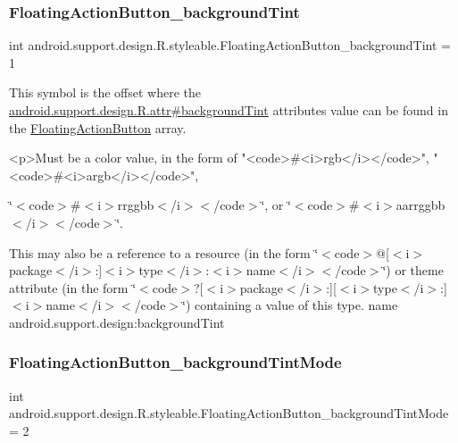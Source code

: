 \subsubsection{\texorpdfstring{Floating\+Action\+Button\+\_\+background\+Tint}{FloatingActionButton\_backgroundTint}}
{\footnotesize\ttfamily int android.\+support.\+design.\+R.\+styleable.\+Floating\+Action\+Button\+\_\+background\+Tint = 1\hspace{0.3cm}{\ttfamily [static]}}

This symbol is the offset where the \hyperlink{classandroid_1_1support_1_1design_1_1R_1_1attr_ad5222449c1177317bb4170da3621846d}{android.\+support.\+design.\+R.\+attr\#background\+Tint} attribute\textquotesingle{}s value can be found in the \hyperlink{classandroid_1_1support_1_1design_1_1R_1_1styleable_ac39eabec239d50ec950ae5f013825830}{Floating\+Action\+Button} array.

\begin{DoxyVerb}      <p>Must be a color value, in the form of "<code>#<i>rgb</i></code>", "<code>#<i>argb</i></code>",
\end{DoxyVerb}
 \char`\"{}$<$code$>$\#$<$i$>$rrggbb$<$/i$>$$<$/code$>$\char`\"{}, or \char`\"{}$<$code$>$\#$<$i$>$aarrggbb$<$/i$>$$<$/code$>$\char`\"{}. 

This may also be a reference to a resource (in the form \char`\"{}$<$code$>$@\mbox{[}$<$i$>$package$<$/i$>$\+:\mbox{]}$<$i$>$type$<$/i$>$\+:$<$i$>$name$<$/i$>$$<$/code$>$\char`\"{}) or theme attribute (in the form \char`\"{}$<$code$>$?\mbox{[}$<$i$>$package$<$/i$>$\+:\mbox{]}\mbox{[}$<$i$>$type$<$/i$>$\+:\mbox{]}$<$i$>$name$<$/i$>$$<$/code$>$\char`\"{}) containing a value of this type.  name android.\+support.\+design\+:background\+Tint \mbox{\label{classandroid_1_1support_1_1design_1_1R_1_1styleable_a08b1b04544782c7a364e8aa475e6ad5e}} 
\subsubsection{\texorpdfstring{Floating\+Action\+Button\+\_\+background\+Tint\+Mode}{FloatingActionButton\_backgroundTintMode}}
{\footnotesize\ttfamily int android.\+support.\+design.\+R.\+styleable.\+Floating\+Action\+Button\+\_\+background\+Tint\+Mode = 2\hspace{0.3cm}{\ttfamily [static]}}

